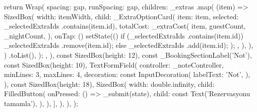 \documentclass[11pt,a4paper]{article}
\begin{document}
\begin{codeblock}
{{{{{                                  return Wrap(
                                    spacing: gap,
                                    runSpacing: gap,
                                    children: _extras
                                        .map(
                                          (item) => SizedBox(
                                            width: itemWidth,
                                            child: _ExtraOptionCard(
                                              item: item,
                                              selected: _selectedExtraIds
                                                  .contains(item.id),
                                              totalCost: _extraCost(
                                                item,
                                                guestCount,
                                                _nightCount,
                                              ),
                                              onTap: () {
                                                setState(() {
                                                  if (_selectedExtraIds
                                                      .contains(item.id)) {
                                                    _selectedExtraIds
                                                        .remove(item.id);
                                                  } else {
                                                    _selectedExtraIds
                                                        .add(item.id);
                                                  }
                                                });
                                              },
                                            ),
                                          ),
                                        )
                                        .toList(),
                                  );
                                },
                              ),
                              const SizedBox(height: 12),
                              const _BookingSectionLabel('Not'),
                              const SizedBox(height: 10),
                              TextFormField(
                                controller: _noteController,
                                minLines: 3,
                                maxLines: 4,
                                decoration: const InputDecoration(
                                  labelText: 'Not',
                                ),
                              ),
                              const SizedBox(height: 18),
                              SizedBox(
                                width: double.infinity,
                                child: FilledButton(
                                  onPressed: () => _submit(state),
                                  child: const Text('Rezervasyonu tamamla'),
                                ),
                              ),
                            ],
                          ),
                        ),
                      );

}}}}
\end{codeblock}
\end{document}
